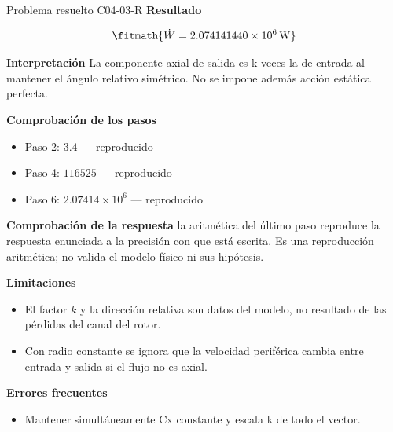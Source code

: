 \documentclass[10pt,openany]{book}
\begin{document}
\begin{studiumworked}{Problema resuelto C04-03-R}
\noindent\textbf{Resultado}

\[
\fitmath{\dot{W}=2.074141440\times10^{6}\,\mathrm{W}}
\]

\noindent\textbf{Interpretación}
La componente axial de salida es k veces la de entrada al mantener el ángulo relativo simétrico. No se impone además acción estática perfecta.

\noindent\textbf{Comprobación de los pasos}
\begin{itemize}
\item Paso 2: $3.4$ — reproducido
\item Paso 4: $116525$ — reproducido
\item Paso 6: $2.07414\times 10^{6}$ — reproducido
\end{itemize}

\noindent\textbf{Comprobación de la respuesta} la aritmética del último paso reproduce la respuesta enunciada a la precisión con que está escrita. Es una reproducción aritmética; no valida el modelo físico ni sus hipótesis.

\noindent\textbf{Limitaciones}
\begin{itemize}
\item El factor $k$ y la dirección relativa son datos del modelo, no resultado de las pérdidas del canal del rotor.
\item Con radio constante se ignora que la velocidad periférica cambia entre entrada y salida si el flujo no es axial.
\end{itemize}

\noindent\textbf{Errores frecuentes}
\begin{itemize}
\item Mantener simultáneamente Cx constante y escala k de todo el vector.
\end{itemize}
\end{studiumworked}
\end{document}
